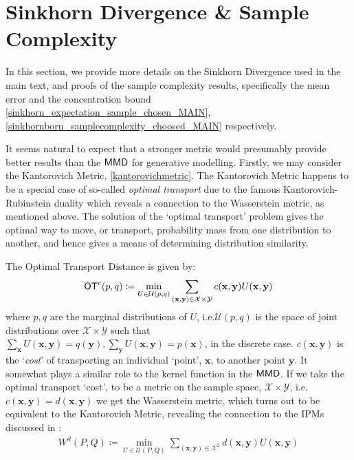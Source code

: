 

\section{Sinkhorn Divergence \& Sample Complexity \label{supp_matt:sinkhorn}}
In this section, we provide more details on the Sinkhorn Divergence used in the main text, and proofs of the sample complexity results, specifically the mean error and the concentration bound \eqref{sinkhorn_expectation_sample_chosen_MAIN}, 
\eqref{sinkhornborn_samplecomplexity_choosed_MAIN} respectively.

It seems natural to expect that a stronger metric would presumably provide better results than the $\operatorname{\textsf{MMD}}$ for generative modelling. Firstly, we may consider the Kantorovich Metric, \eqref{kantorovichmetric}. The Kantorovich Metric happens to be a special case of so-called \textit{optimal transport} due to the famous  Kantorovich-Rubinstein duality which reveals a connection to the Wasserstein metric, as mentioned above. The solution of the `optimal transport' problem gives the optimal way to move, or transport, probability mass from one distribution to another, and hence gives a means of determining distribution similarity. 

The Optimal Transport Distance is given by:
\begin{align}
\operatorname{\textsf{OT}}^c(p, q)  \coloneqq \min\limits_{U \in \mathcal{U}(p, q)}\sum\limits_{(\mathbf{x}, \mathbf{y}) \in \mathcal{X}\times\mathcal{Y}} c(\mathbf{x}, \mathbf{y}) U(\mathbf{x}, \mathbf{y}) \label{otdistance_supp}
\end{align}
where $p, q$ are the marginal distributions of $U$, i.e.\@\@ $\mathcal{U}(p, q)$ is the space of joint distributions over $\mathcal{X}\times\mathcal{Y}$ such that $\sum_{\mathbf{x}}U(\mathbf{x}, \mathbf{y}) = q(\mathbf{y}), \sum_{\mathbf{y}}U(\mathbf{x}, \mathbf{y}) = p(\mathbf{x})$, in the discrete case. $c(\mathbf{x}, \mathbf{y})$ is the `\textit{cost}' of transporting an individual `point', $\mathbf{x}$, to another point $\mathbf{y}$. It somewhat plays a similar role to the kernel function in the $\operatorname{\textsf{MMD}}$. If we take the optimal transport `cost', to be a metric on the sample space, $\mathcal{X}\times \mathcal{Y}$, i.e.\@ $c(\mathbf{x}, \mathbf{y}) = d(\mathbf{x}, \mathbf{y})$ we get the Wasserstein metric, which turns out to be equivalent to  the Kantorovich Metric, revealing the connection to the IPMs discussed in :
\begin{align}
W^d(P, Q)  \coloneqq \min\limits_{U \in \mathcal{U}(P, Q)}\sum\limits_{(\mathbf{x}, \mathbf{y}) \in \mathcal{X}^2} d(\mathbf{x}, \mathbf{y}) U(\mathbf{x}, \mathbf{y}) \label{1wasserstein_supp}
\end{align}

